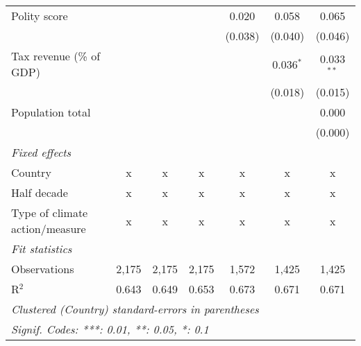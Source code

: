 \begin{tabular}{lcccccc}
   Polity score                                         &               &                &                & 0.020          & 0.058          & 0.065\\   
                                                        &               &                &                & (0.038)        & (0.040)        & (0.046)\\   
   Tax revenue (\% of GDP)                              &               &                &                &                & 0.036$^{*}$    & 0.033$^{**}$\\   
                                                        &               &                &                &                & (0.018)        & (0.015)\\   
   Population total                                     &               &                &                &                &                & 0.000\\   
                                                        &               &                &                &                &                & (0.000)\\   
   \emph{Fixed effects}\\
   Country                                              & x             & x              & x              & x              & x              & x\\  
   Half decade                                          & x             & x              & x              & x              & x              & x\\  
   Type of climate action/measure                       & x             & x              & x              & x              & x              & x\\  
   \midrule \emph{Fit statistics}\\
   Observations                                         & 2,175         & 2,175          & 2,175          & 1,572          & 1,425          & 1,425\\  
   R$^2$                                                & 0.643         & 0.649          & 0.653          & 0.673          & 0.671          & 0.671\\  
   \midrule
   \multicolumn{7}{l}{\emph{Clustered (Country) standard-errors in parentheses}}\\
   \multicolumn{7}{l}{\emph{Signif. Codes: ***: 0.01, **: 0.05, *: 0.1}}\\
\end{tabular}
\par\endgroup


